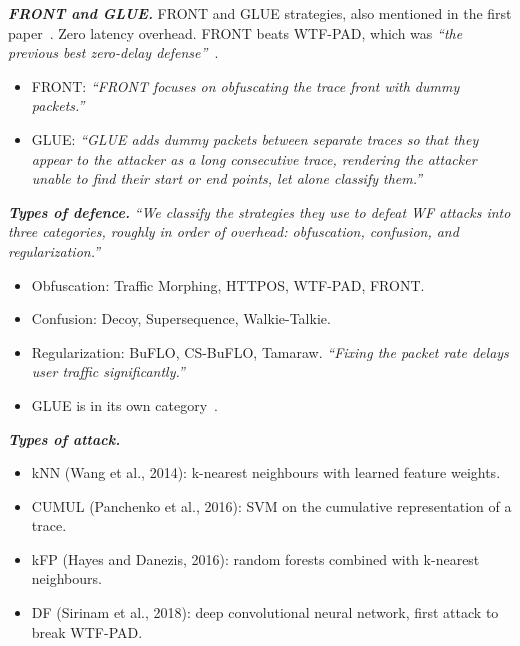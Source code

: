 \textbf{\textit{FRONT and GLUE.}}
FRONT and GLUE strategies, also mentioned in the first paper~\cite{siby2023quic}. Zero latency overhead. FRONT beats WTF-PAD, which was \textit{``the previous best zero-delay defense''}~\cite[p.~718]{gong2020front}.
\begin{itemize}
    \item FRONT: \textit{``FRONT focuses on obfuscating the trace front with dummy packets.''}~\cite[p.~717]{gong2020front}
    \item GLUE: \textit{``GLUE adds dummy packets between separate traces so that they appear to the attacker as a long consecutive trace, rendering the attacker unable to find their start or end points, let alone classify them.''}~\cite[p.~717]{gong2020front}
\end{itemize}

\textbf{\textit{Types of defence.}}
\textit{``We classify the strategies they use to defeat WF attacks into three categories, roughly in order of overhead: obfuscation, confusion, and regularization.''}~\cite[p.~718]{gong2020front}
\begin{itemize}
    \item Obfuscation: Traffic Morphing, HTTPOS, WTF-PAD, FRONT.
    \item Confusion: Decoy, Supersequence, Walkie-Talkie.
    \item Regularization: BuFLO, CS-BuFLO, Tamaraw. \textit{``Fixing the packet rate delays user traffic significantly.''}~\cite[p.~718]{gong2020front}
    \item GLUE is in its own category~\cite[p.~719]{gong2020front}.
\end{itemize}

\textbf{\textit{Types of attack.}}~\cite[pp.~718--719]{gong2020front}
\begin{itemize}
    \item kNN (Wang et al., 2014): k-nearest neighbours with learned feature weights.
    \item CUMUL (Panchenko et al., 2016): SVM on the cumulative representation of a trace.
    \item kFP (Hayes and Danezis, 2016): random forests combined with k-nearest neighbours.
    \item DF (Sirinam et al., 2018): deep convolutional neural network, first attack to break WTF-PAD.
\end{itemize}

